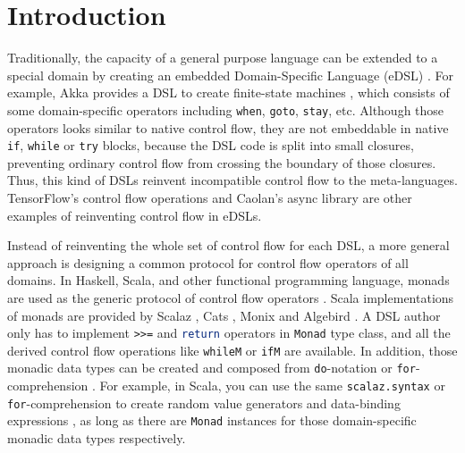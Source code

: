 \maketitle

\section{Introduction}\label{Introduction}

Traditionally, the capacity of a general purpose language can be extended to a special domain by creating an embedded Domain-Specific Language (eDSL) \cite{fowler2010domain} . For example, Akka provides a DSL to create finite-state machines \cite{lightbend2017akka}, which consists of some domain-specific operators including \lstinline{when}, \lstinline{goto}, \lstinline{stay}, etc. Although those operators looks similar to native control flow, they are not embeddable in native \lstinline{if}, \lstinline{while} or \lstinline{try} blocks, because the DSL code is split into small closures, preventing ordinary control flow from crossing the boundary of those closures. Thus, this kind of DSLs reinvent incompatible control flow to the meta-languages. TensorFlow's control flow operations \cite{abadi2016tensorflow} and Caolan's async library \cite{caolan2017async} are other examples of reinventing control flow in eDSLs.

Instead of reinventing the whole set of control flow for each DSL, a more general approach is designing a common protocol for control flow operators of all domains. In Haskell, Scala, and other functional programming language, monads are used as the generic protocol of control flow operators \cite{wadler1990comprehending,wadler1992essence,jones1993composing}. Scala implementations of monads are provided by Scalaz \cite{kenji2017scalaz}, Cats \cite{typelevel2017cats}, Monix \cite{nedelcu2017monix} and Algebird \cite{twitter2016algebird}.  A DSL author only has to implement \lstinline{>>=} and \lstinline[language=Haskell,deletekeywords={return}]{return} operators in \lstinline{Monad} type class, and all the derived control flow operations like \lstinline{whileM} or \lstinline{ifM} are available. In addition, those monadic data types can be created and composed from \lstinline{do}-notation \cite{jones1998haskell} or \lstinline{for}-comprehension \cite{odersky2004scala}. For example, in Scala, you can use the same \lstinline{scalaz.syntax} or \lstinline{for}-comprehension to create random value generators \cite{nilsson2015scalacheck} and data-binding expressions \cite{yangbo2016binding}, as long as there are \lstinline{Monad} instances for those domain-specific monadic data types respectively.

